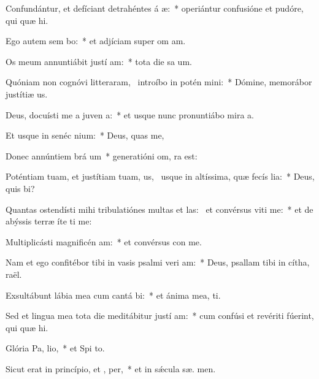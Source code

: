 \item Confundántur, et defíciant detrahéntes á æ:~* operiántur confusióne et pudóre, qui quæ  hi.
\item Ego autem sem bo:~* et adjíciam super om  am.
\item Os meum annuntiábit justí am:~* tota die sa um.
\item Quóniam non cognóvi litteraram,~\pscross{} introíbo in potén mini:~* Dómine, memorábor justítiæ  us.
\item Deus, docuísti me a juven a:~* et usque nunc pronuntiábo mira a.
\item Et usque in senéc  nium:~* Deus,  quas me,
\item Donec annúntiem brá um~* generatióni om,  ra est:
\item Poténtiam tuam, et justítiam tuam, us,~\pscross{} usque in altíssima, quæ fecís lia:~* Deus, quis  bi?
\item Quantas ostendísti mihi tribulatiónes multas et las:~\pscross{} et convérsus viti me:~* et de abýssis terræ íte ti me:
\item Multiplicásti magnificén am:~* et convérsus con  me.
\item Nam et ego confitébor tibi in vasis psalmi veri am:~* Deus, psallam tibi in cítha,  raël.
\item Exsultábunt lábia mea cum cantá bi:~* et ánima mea,  ti.
\item Sed et lingua mea tota die meditábitur justí am:~* cum confúsi et revériti fúerint, qui quæ  hi.
\item Glória Pa,  lio,~* et Spi to.
\item Sicut erat in princípio, et ,  per,~* et in sǽcula sæ. men.
